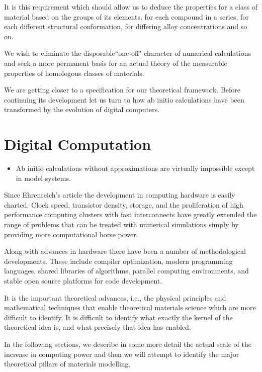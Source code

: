 It is this requirement which should allow us to deduce the properties
for a class of material based on the groups of its elements, 
for each compound in a series, for each different structural conformation,
for differing alloy concentrations and so on. 

We wish to eliminate the disposable``one-off" character of 
numerical calculations and seek a more permanent basis for an actual 
theory of the measurable properties of homologous classes of materials.

We are getting closer to a specification for our theoretical framework. 
Before continuing its development let us turn to how ab initio calculations have been 
transformed by the evolution of digital computers. 

\section{Digital Computation}
\label{sec:riseofcomp}

\begin{itemize}
\item Ab initio calculations without approximations are virtually impossible 
      except in model systems.
\end{itemize}

Since Ehrenreich's article the development in computing hardware is easily charted. 
Clock speed, transistor density, storage, and the proliferation of high 
performance computing clusters with fast interconnects have greatly extended 
the range of problems that can be treated with numerical simulations
simply by providing more computational horse power.

Along with advances in hardware there have been a number
of methodological developments. These include compiler 
optimization, modern programming languages, 
shared libraries of algorithms, parallel computing environments, and 
stable open source platforms for code development.

It is the important theoretical advances, i.e., the physical principles and
mathematical techniques that enable theoretical materials science 
which are more difficult to identify. It is difficult to identify what exactly 
the kernel of the theoretical idea is, and what precisely that idea has enabled. 

In the following sections, we describe in some more detail the 
actual scale of the increase in computing power and then we will
attempt to identify the major theoretical pillars of 
materials modelling.


